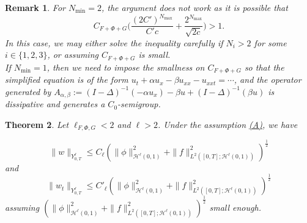 \documentclass[10pt,a4paper,final]{article}
\numberwithin{equation}{section}
\newtheorem{theorem}{Theorem}[section]
\newtheorem{remark}[theorem]{Remark}
\newcommand{\cH}{\mathcal{H}}
\newcommand{\Ga}{\alpha}
\newcommand{\Gb}{\beta}
\begin{document}
\begin{remark}
    For $N_{\min}=2$, the argument does not work as it is possible that $$C_{F+\Phi+G}\bigg(\frac{(2C')^{N_{\max}}}{C'c}+\frac{2^{N_{\max}}}{\sqrt{2c}}  \bigg)>1.$$
 In this case, we may either solve the inequality carefully if $N_i>2$ for some $i\in \{1,2,3\}$, or assuming $C_{F+\Phi+G}$ is small.\\


     If $N_{\min}=1$, then we need to impose the smallness on $C_{F+\Phi+G}$ so that the simplified equation is of the form 
     $u_t+\Ga u_{x}-\Gb u_{xx}-u_{xxt}=\cdots$, and the operator generated by $A_{\Ga,\Gb}:=(I-\Delta)^{-1}(-\Ga u_x)-\Gb u+(I-\Delta)^{-1}(\Gb u)$ is dissipative and generates a $C_0$-semigroup.
\end{remark}

\begin{theorem}\label{thm67}
     Let $\ell_{F,\Phi,G}<2$ and $\ell>2$.     Under the assumption \hyperlink{(A)}{(A)}, we have 

$$\|w\|_{Y^\ell_{0,T}}\leq  C_{\ell}( \|\phi\|_{\cH^\ell(0,1)}^2+\|f\|_{L^2([0,T];\cH^\ell(0,1))}^2)^{\frac{1}{2}}$$
and
$$\|w_t\|_{Y^\ell_{0,T}}\leq  C'_{\ell}( \|\phi\|_{\cH^\ell(0,1)}^2+\|f\|_{L^2([0,T];\cH^\ell(0,1))}^2)^{\frac{1}{2}}$$
assuming $( \|\phi\|_{\cH^\ell(0,1)}^2+\|f\|_{L^2([0,T];\cH^\ell(0,1))}^2)^{\frac{1}{2}}$ small enough.
\end{theorem}
\end{document}

